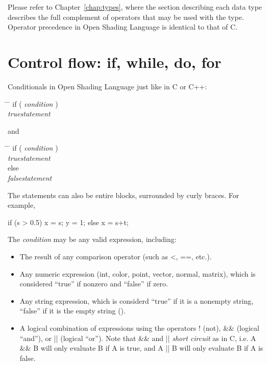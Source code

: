 \documentclass[11pt,letterpaper]{book}
\def\langname{Open Shading Language\xspace}
\def\color{{\cf color}\xspace}
\def\inttype{{\cf int}\xspace}
\def\matrix{{\cf matrix}\xspace}
\def\normal{{\cf normal}\xspace}
\def\point{{\cf point}\xspace}
\def\vector{{\cf vector}\xspace}
\begin{document}
Please refer to Chapter~\ref{chap:types}, where the section describing
each data type describes the full complement of operators that may be
used with the type.  Operator precedence in \langname is identical to
that of C.


\section{Control flow: {\cf if, while, do, for}}
\label{sec:controlflow}

Conditionals in \langname just like in C or C++:

\begin{tabbing}
\hspace{0.5in} \= \hspace{0.3in} \= \kill
\> {\cf if (} \emph{condition} {\cf )} \\
\> \> \emph{truestatement}  
\end{tabbing}

\noindent and

\begin{tabbing}
\hspace{0.5in} \= \hspace{0.3in} \= \kill
\> {\cf if (} \emph{condition} {\cf )} \\
\> \> \emph{truestatement}  \\
\> {\cf else} \\
\> \> \emph{falsestatement}  
\end{tabbing}

\noindent The statements can also be entire blocks, surrounded by curly
braces.  For example,

\begin{code}
       if (s > 0.5) {
           x = s;
           y = 1;
       } else {
           x = s+t;
       }
\end{code}

\noindent The \emph{condition} may be any valid expression, including:

\begin{itemize}
\item The result of any comparison operator (such as {\cf <}, {\cf ==},
  etc.).
\item Any numeric expression (\inttype, \color, \point, \vector,
  \normal, \matrix), which is considered ``true'' if nonzero and
  ``false'' if zero.
\item Any string expression, which is considerd ``true'' if it is a
  nonempty string, ``false'' if it is the empty string (\qkw{}).
\item A logical combination of expressions using the operators {\cf !}
  (not), {\cf \&\&} (logical ``and''), or {\cf ||} (logical ``or'').
  Note that {\cf \&\&} and {\cf ||} \emph{short circuit} as in C,
  i.e. {\cf A \&\& B} will only evaluate B if A is true, and {\cf A ||
    B} will only evaluate B if A is false.
\end{itemize}
\end{document}
